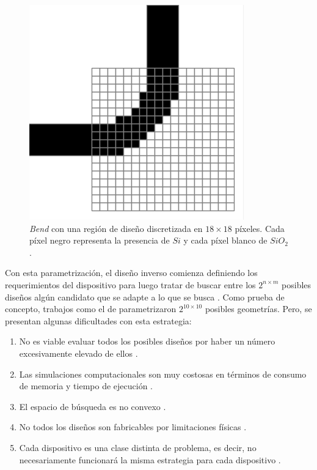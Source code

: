\begin{figure}[ht]
  \centering
  \includegraphics[scale=0.6]{image/introduction/bend-discretization.png}
  \caption{\emph{Bend} con una región de diseño discretizada en $18 \times 18$
  píxeles. Cada píxel negro representa la presencia de $Si$ y cada píxel blanco
  de $SiO_2$.}
  \label{fig:bend-discretization}
\end{figure}

Con esta parametrización, el diseño inverso comienza definiendo los requerimientos del dispositivo para luego tratar de buscar entre los $2^{n \times m}$ posibles diseños algún candidato que se adapte a lo que se busca \citep{Su2020, Molesky2018}.
Como prueba de concepto, trabajos como el de \cite{Malheiros-Silveira2020} parametrizaron $2^{10 \times 10}$ posibles geometrías.
Pero, se presentan algunas dificultades con esta estrategia:

\begin{enumerate}
  \item No es viable evaluar todos los posibles diseños por haber un número excesivamente elevado de ellos \citep{Vuckovic2019}.
  \item Las simulaciones computacionales son muy costosas en términos de consumo de memoria y 
    tiempo de ejecución \citep{Kudyshev2020}.
  \item El espacio de búsqueda es no convexo \citep{Su2018}.
  \item No todos los diseños son fabricables por limitaciones físicas \citep{Su2020}.
  \item Cada dispositivo es una clase distinta de problema, es decir, no necesariamente funcionará la misma estrategia para cada dispositivo \citep{Molesky2018}.
\end{enumerate}

